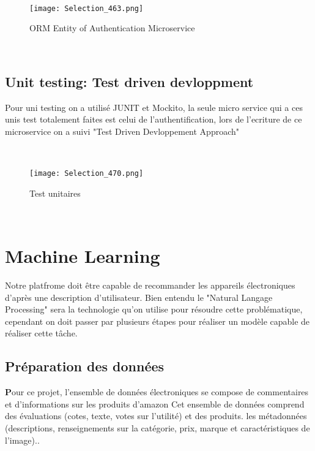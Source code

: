 \\
\begin{figure}[!htb] 
\begin{center} 
\texttt{[image: Selection\_463.png]}    
\end{center} 
\caption{ORM Entity of Authentication Microservice} 
\end{figure}  \FloatBarrier
\\

\subsection{Unit testing: Test driven devloppment}
Pour uni testing on a utilisé JUNIT et Mockito, la seule micro service qui a ces unis test totalement faites est celui de l'authentification, lors de l'ecriture de ce microservice on a suivi "Test Driven Devloppement Approach" 

\\
\begin{figure}[!htb] 
\begin{center} 
\texttt{[image: Selection\_470.png]}    
\end{center} 
\caption{Test unitaires}
\end{figure}  \FloatBarrier
\\
\section{Machine Learning}

Notre platfrome doit être capable de recommander les appareils électroniques d'après une description d'utilisateur. Bien entendu le "Natural Langage Processing" sera la technologie qu'on utilise pour résoudre cette problématique, cependant on doit passer par plusieurs étapes pour réaliser un modèle capable de réaliser cette tâche.

\subsection{Préparation des données }

\textbf Pour ce projet, l’ensemble de données électroniques se compose de commentaires et d’informations sur les produits d’amazon
Cet ensemble de données comprend des évaluations (cotes, texte, votes sur l’utilité) et des produits.
les métadonnées (descriptions, renseignements sur la catégorie, prix, marque et caractéristiques de l’image)..


